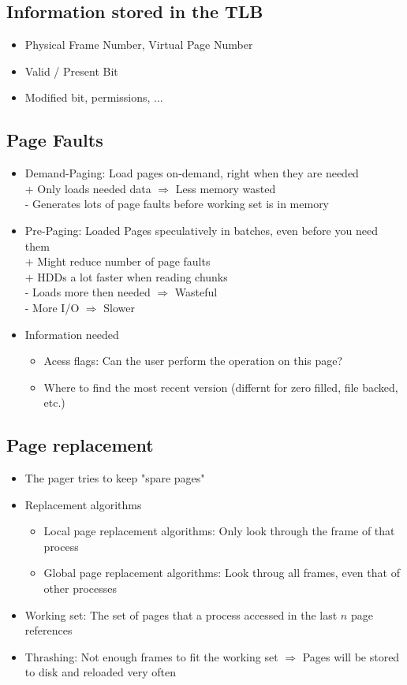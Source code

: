 \documentclass{kit}
\begin{document}
  \subsection{Information stored in the TLB}
    \begin{itemize}
      \item Physical Frame Number, Virtual Page Number
      \item Valid / Present Bit
      \item Modified bit, permissions, ...
    \end{itemize}
  \subsection{Page Faults}
    \begin{itemize}
      \item Demand-Paging: Load pages on-demand, right when they are needed\\
        + Only loads needed data $\Rightarrow$ Less memory wasted\\
        - Generates lots of page faults before working set is in memory
      \item Pre-Paging: Loaded Pages speculatively in batches, even before you need them\\
        + Might reduce number of page faults\\
        + HDDs a lot faster when reading chunks\\
        - Loads more then needed $\Rightarrow$ Wasteful\\
        - More I/O $\Rightarrow$ Slower
      \item Information needed
        \begin{itemize}
          \item Acess flags: Can the user perform the operation on this page?
          \item Where to find the most recent version (differnt for zero filled, file backed, etc.)
        \end{itemize}
    \end{itemize}
  \subsection{Page replacement}
    \begin{itemize}
      \item The pager tries to keep "spare pages"
      \item Replacement algorithms
        \begin{itemize}
          \item Local page replacement algorithms: Only look through the frame of that process
          \item Global page replacement algorithms: Look throug all frames, even that of other processes
        \end{itemize}
      \item Working set: The set of pages that a process accessed in the last $n$ page references
      \item Thrashing: Not enough frames to fit the working set $\Rightarrow$ Pages will be stored to disk and reloaded
        very often
    \end{itemize}
\end{document}
